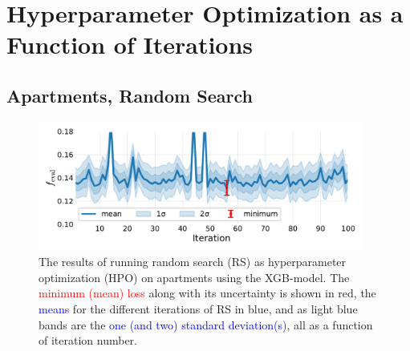 \FloatBarrier
\section{Hyperparameter Optimization as a Function of Iterations}


\subsection*{Apartments, Random Search}
\begin{figure}
  \centerfloat
  \includegraphics[width=0.95\textwidth, trim=10 20 10 10, clip]{figures/housing/Ejerlejlighed_v19_cut_all_Ncols_all_xgb_score_over_time_random.pdf}
  \caption[Random Search Results as a Function of Iteration for Apartments]
          {The results of running random search (RS) as hyperparameter optimization (HPO) on apartments using the XGB-model. The \textcolor{red}{minimum (mean) loss} along with its uncertainty is shown in red, the \textcolor{blue}{means} for the different iterations of RS in blue, and as light blue bands are the \textcolor{blue}{one (and two) standard deviation(s)}, all as a function of iteration number.} 
\end{figure}


\FloatBarrier
